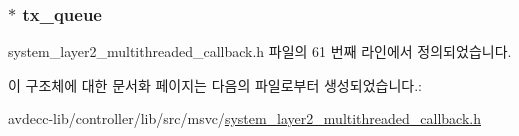 \subsubsection[{\texorpdfstring{tx\+\_\+queue}{tx_queue}}]{$\ast$ tx\+\_\+queue}\hypertarget{structavdecc__lib_1_1system__layer2__multithreaded__callback_1_1msg__poll_af328d89cdcae8c180cbfcff63c8712fd}{}\label{structavdecc__lib_1_1system__layer2__multithreaded__callback_1_1msg__poll_af328d89cdcae8c180cbfcff63c8712fd}


system\+\_\+layer2\+\_\+multithreaded\+\_\+callback.\+h 파일의 61 번째 라인에서 정의되었습니다.



이 구조체에 대한 문서화 페이지는 다음의 파일로부터 생성되었습니다.\+:\begin{DoxyCompactItemize}
\item 
avdecc-\/lib/controller/lib/src/msvc/\hyperlink{msvc_2system__layer2__multithreaded__callback_8h}{system\+\_\+layer2\+\_\+multithreaded\+\_\+callback.\+h}\end{DoxyCompactItemize}
